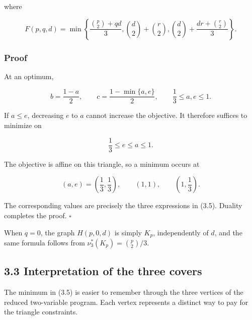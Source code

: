 \documentclass[
  11pt,
]{article}
\begin{document}
where

\[
\boxed{
F(p,q,d)
=
\min\left\{
\frac{\binom p2+qd}{3},
\binom d2+\binom r2,
\binom d2+\frac{dr+\binom r2}{3}
\right\}.
}
\tag{3.5}
\]

\subsubsection{Proof}\label{proof}

At an optimum,

\[
b=\frac{1-a}{2},
\qquad
c=\frac{1-\min\{a,e\}}2,
\qquad
\frac13\le a,e\le1.
\]

If \(a\le e\), decreasing \(e\) to \(a\) cannot increase the objective.
It therefore suffices to minimize on

\[
\frac13\le e\le a\le1.
\]

The objective is affine on this triangle, so a minimum occurs at

\[
(a,e)=\left(\frac13,\frac13\right),
\qquad
(1,1),
\qquad
\left(1,\frac13\right).
\]

The corresponding values are precisely the three expressions in (3.5).
Duality completes the proof. \(\square\)

When \(q=0\), the graph \(H(p,0,d)\) is simply \(K_p\), independently of
\(d\), and the same formula follows from \(\nu_3^*(K_p)=\binom p2/3\).

\subsection{3.3 Interpretation of the three
covers}\label{interpretation-of-the-three-covers}

The minimum in (3.5) is easier to remember through the three vertices of
the reduced two-variable program. Each vertex represents a distinct way
to pay for the triangle constraints.
\end{document}
